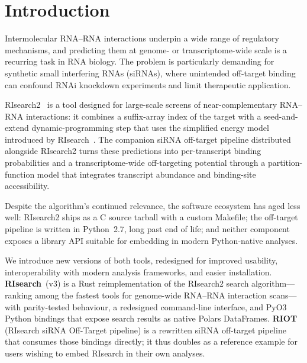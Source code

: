 \section{Introduction}

Intermolecular RNA--RNA interactions underpin a wide range of regulatory
mechanisms, and predicting them at genome- or transcriptome-wide scale is a
recurring task in RNA biology. The problem is particularly demanding for
synthetic small interfering RNAs (siRNAs), where unintended off-target
binding can confound RNAi knockdown experiments and limit therapeutic
application.

RIsearch2~\citep{alkan2017risearch2} is a tool designed for large-scale
screens of near-complementary RNA--RNA interactions: it combines a
suffix-array index of the target with a seed-and-extend dynamic-programming
step that uses the simplified energy model introduced by
RIsearch~\citep{wenzel2012risearch}. The companion siRNA off-target pipeline
distributed alongside RIsearch2 turns these predictions into per-transcript
binding probabilities and a transcriptome-wide off-targeting potential
through a partition-function model that integrates transcript abundance and
binding-site accessibility.

Despite the algorithm's continued relevance, the software ecosystem has aged
less well: RIsearch2 ships as a C source tarball with a custom Makefile; the
off-target pipeline is written in Python~2.7, long past end of life; and
neither component exposes a library API suitable for embedding in modern
Python-native analyses.

We introduce new versions of both tools, redesigned for improved usability,
interoperability with modern analysis frameworks, and easier installation.
\textbf{RIsearch}~(v3) is a Rust reimplementation of the RIsearch2 search
algorithm---ranking among the fastest tools for genome-wide RNA--RNA
interaction scans---with parity-tested behaviour, a redesigned command-line
interface, and PyO3 Python bindings that expose search results as native Polars
DataFrames. \textbf{RIOT} (RIsearch siRNA Off-Target pipeline) is a rewritten
siRNA off-target pipeline that consumes those bindings directly; it thus
doubles as a reference example for users wishing to embed RIsearch in their own
analyses.

